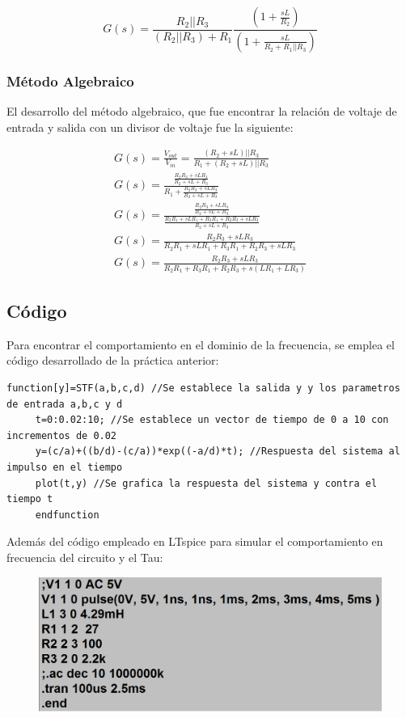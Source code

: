 \documentclass{article}
\begin{document}
	\begin{equation}
G(s)=\frac{R_2||R_3}{(R_2||R_3)+R_1} \frac{\left(1+\frac{sL}{R_2}\right)}{\left(1+\frac{sL}{R_2+R_1||R_3}\right)}
	\end{equation}
	
	\subsubsection{Método Algebraico}
	El desarrollo del método algebraico, que fue encontrar la relación de voltaje de entrada y salida con un divisor de voltaje fue la siguiente:
	
   \begin{equation}
   \begin{split}
   G(s)=\frac{V_{out}}{V_{in}}=\frac{(R_2+sL)||R_3}{R_1+(R_2+sL)||R_3}\\
  G(s)=\frac{\frac{R_2R_3+sLR_3}{R_2+sL+R_3}}{R_1+\frac{R_2R_3+sLR_3}{R_2+sL+R_3}}\\
   G(s)=\frac{\frac{R_2R_3+sLR_3}{R_2+sL+R_3}}{\frac{R_2R_1+sLR_1+R_3R_1+R_2R_3+sLR_3}{R_2+sL+R_3}}\\
   G(s)=\frac{R_2R_3+sLR_3}{R_2R_1+sLR_1+R_3R_1+R_2R_3+sLR_3}\\
    G(s)=\frac{R_2R_3+sLR_3}{R_2R_1+R_3R_1+R_2R_3+s(LR_1+LR_3)}
   \end{split}
   \end{equation}
	
	
	 \subsection{Código}
	 Para encontrar el comportamiento en el dominio de la frecuencia, se emplea el código desarrollado de la práctica anterior:
	 	 \begin{lstlisting}[frame=single]
	 function[y]=STF(a,b,c,d) //Se establece la salida y y los parametros de entrada a,b,c y d
	 t=0:0.02:10; //Se establece un vector de tiempo de 0 a 10 con incrementos de 0.02
	 y=(c/a)+((b/d)-(c/a))*exp((-a/d)*t); //Respuesta del sistema al impulso en el tiempo
	 plot(t,y) //Se grafica la respuesta del sistema y contra el tiempo t
	 endfunction 
	 \end{lstlisting} 
	 
	 Además del código empleado en LTspice para simular el comportamiento en frecuencia del circuito y el Tau:
	 
	 \begin{figure}[H]
	 	\centering
	 	\includegraphics[scale=0.2]{cod}
	 	\caption{}
	 	\label{fig:cod}
	 \end{figure}
	 
\end{document}
